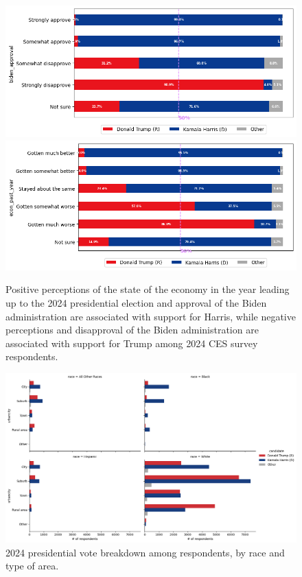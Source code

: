 \documentclass[letter]{article}
\begin{document}
\begin{figure}[H]
    \includegraphics[scale=0.42]{eda/ces24-biden.png}
    \includegraphics[scale=0.42]{eda/ces24-econ.png}
    \caption{Positive perceptions of the state of the economy in the year leading up to the 2024 presidential election and approval of the Biden administration are associated with support for Harris, while negative perceptions and disapproval of the Biden administration are associated with support for Trump among 2024 CES survey respondents.}
    \label{fig:ces-vote_counts}
\end{figure} 
\begin{figure}[H]
\centering
\includegraphics[scale=0.45]{eda/ces24-race_region.png}
\caption{2024 presidential vote breakdown among respondents, by race and type of area.}
\label{fig:raceregion}
\end{figure}
\end{document}
